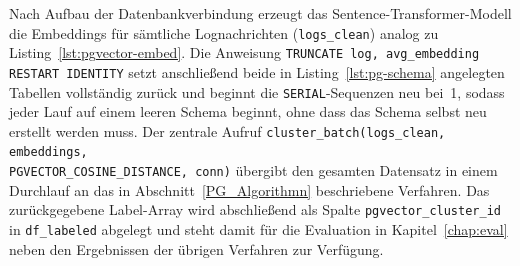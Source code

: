 Nach Aufbau der Datenbankverbindung erzeugt das Sentence-Transformer-Modell
die Embeddings für sämtliche Lognachrichten (\texttt{logs\_clean}) analog zu
Listing~\ref{lst:pgvector-embed}. Die Anweisung \texttt{TRUNCATE log,
avg\_embedding RESTART IDENTITY} setzt anschließend beide in
Listing~\ref{lst:pg-schema} angelegten Tabellen vollständig zurück und
beginnt die \texttt{SERIAL}-Sequenzen neu bei~1, sodass jeder Lauf auf einem
leeren Schema beginnt, ohne dass das Schema selbst neu erstellt werden muss.
Der zentrale Aufruf \texttt{cluster\_batch(logs\_clean, embeddings, \\
PGVECTOR\_COSINE\_DISTANCE, conn)} übergibt den gesamten Datensatz in einem
Durchlauf an das in Abschnitt~\ref{PG_Algorithmn} beschriebene Verfahren. Das
zurückgegebene Label-Array wird abschließend als Spalte
\texttt{pgvector\_cluster\_id} in \texttt{df\_labeled} abgelegt und steht
damit für die Evaluation in Kapitel~\ref{chap:eval} neben den Ergebnissen der
übrigen Verfahren zur Verfügung.